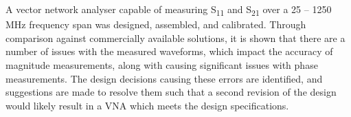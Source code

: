 A vector network analyser capable of measuring S\textsubscript{11} and S\textsubscript{21} over a 25 – 1250 MHz frequency span was designed, assembled, and calibrated. Through comparison against commercially available solutions, it is shown that there are a number of issues with the measured waveforms, which impact the accuracy of magnitude measurements, along with causing significant issues with phase measurements. The design decisions causing these errors are identified, and suggestions are made to resolve them such that a second revision of the design would likely result in a VNA which meets the design specifications. 
